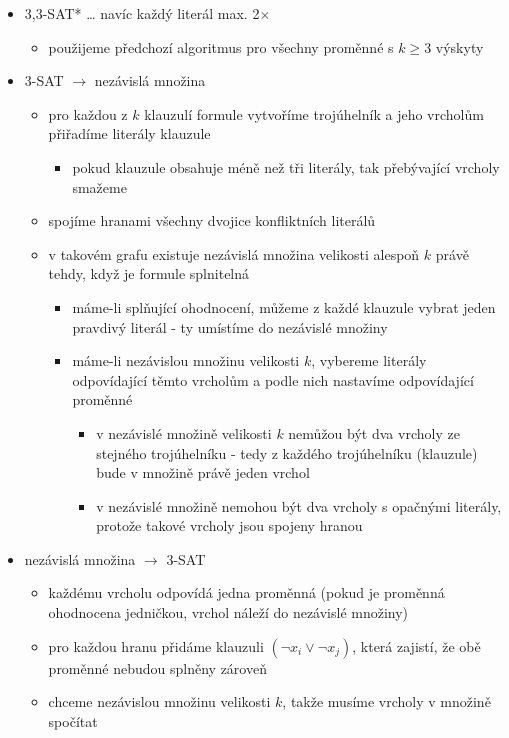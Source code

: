 \begin{itemize}
\begin{itemize}
\begin{itemize}
\end{itemize}
\item 3,3-SAT* \dots{} navíc každý literál max. 2$\times$
\begin{itemize}
\item použijeme předchozí algoritmus pro všechny proměnné s $k \geq 3$ výskyty
\end{itemize}
\item 3-SAT $\to$ nezávislá množina
\begin{itemize}
\item pro každou z $k$ klauzulí formule vytvoříme trojúhelník a jeho vrcholům přiřadíme literály klauzule
\begin{itemize}
\item pokud klauzule obsahuje méně než tři literály, tak přebývající vrcholy smažeme
\end{itemize}
\item spojíme hranami všechny dvojice konfliktních literálů
\item v takovém grafu existuje nezávislá množina velikosti alespoň $k$ právě tehdy, když je formule splnitelná
\begin{itemize}
\item máme-li splňující ohodnocení, můžeme z každé klauzule vybrat jeden pravdivý literál - ty umístíme do nezávislé množiny
\item máme-li nezávislou množinu velikosti $k$, vybereme literály odpovídající těmto vrcholům a podle nich nastavíme odpovídající proměnné
\begin{itemize}
\item v nezávislé množině velikosti $k$ nemůžou být dva vrcholy ze stejného trojúhelníku - tedy z každého trojúhelníku (klauzule) bude v množině právě jeden vrchol
\item v nezávislé množině nemohou být dva vrcholy s opačnými literály, protože takové vrcholy jsou spojeny hranou
\end{itemize}
\end{itemize}
\end{itemize}
\item nezávislá množina $\to$ 3-SAT
\begin{itemize}
\item každému vrcholu odpovídá jedna proměnná (pokud je proměnná ohodnocena jedničkou, vrchol náleží do nezávislé množiny)
\item pro každou hranu přidáme klauzuli $(\neg x_i\lor\neg x_j)$, která zajistí, že obě proměnné nebudou splněny zároveň
\item chceme nezávislou množinu velikosti $k$, takže musíme vrcholy v množině spočítat

\end{itemize}
\end{itemize}
\end{itemize}
